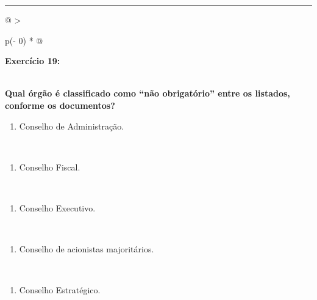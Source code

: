 \documentclass[
]{book}
\providecommand{\tightlist}{%
  \setlength{\itemsep}{0pt}\setlength{\parskip}{0pt}}
\begin{document}
\begin{center}\rule{0.5\linewidth}{0.5pt}\end{center}

\begin{longtable}[]{@{}
  >{\raggedright\arraybackslash}p{(\columnwidth - 0\tabcolsep) * }@{}}
\toprule\noalign{}
\begin{minipage}[b]{\linewidth}\raggedright
\textbf{Exercício 19:}
\end{minipage} \\
\midrule\noalign{}
\endhead
\bottomrule\noalign{}
\endlastfoot
\textbf{Qual órgão é classificado como ``não obrigatório'' entre os listados, conforme os documentos?} \\
\begin{minipage}[t]{\linewidth}\raggedright
\begin{enumerate}
\def\labelenumi{\alph{enumi})}
\tightlist
\item
  Conselho de Administração.
\end{enumerate}
\end{minipage} \\
\begin{minipage}[t]{\linewidth}\raggedright
\begin{enumerate}
\def\labelenumi{\alph{enumi})}
\setcounter{enumi}{1}
\tightlist
\item
  Conselho Fiscal.
\end{enumerate}
\end{minipage} \\
\begin{minipage}[t]{\linewidth}\raggedright
\begin{enumerate}
\def\labelenumi{\alph{enumi})}
\setcounter{enumi}{2}
\tightlist
\item
  Conselho Executivo.
\end{enumerate}
\end{minipage} \\
\begin{minipage}[t]{\linewidth}\raggedright
\begin{enumerate}
\def\labelenumi{\alph{enumi})}
\setcounter{enumi}{3}
\tightlist
\item
  Conselho de acionistas majoritários.
\end{enumerate}
\end{minipage} \\
\begin{minipage}[t]{\linewidth}\raggedright
\begin{enumerate}
\def\labelenumi{\alph{enumi})}
\setcounter{enumi}{4}
\tightlist
\item
  Conselho Estratégico.
\end{enumerate}
\end{minipage} \\
\end{longtable}
\end{document}
